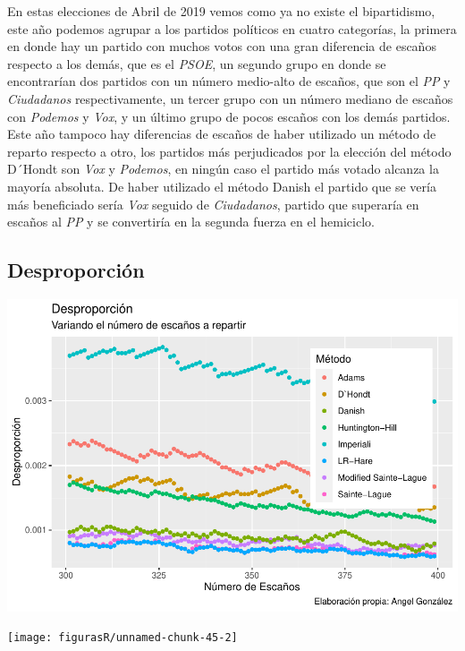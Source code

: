 \documentclass[12pt,a4paper,]{book}
\numberwithin{dummy}{section}
\theoremstyle{ocrenumbox}
\theoremstyle{blacknumex}
\theoremstyle{blacknumbox}
\theoremstyle{ocrenum}
\theoremstyle{ocrenum}
\begin{document}
En estas elecciones de Abril de 2019 vemos como ya no existe el
bipartidismo, este año podemos agrupar a los partidos políticos en
cuatro categorías, la primera en donde hay un partido con muchos votos
con una gran diferencia de escaños respecto a los demás, que es el
\emph{PSOE}, un segundo grupo en donde se encontrarían dos partidos con
un número medio-alto de escaños, que son el \emph{PP} y
\emph{Ciudadanos} respectivamente, un tercer grupo con un número mediano
de escaños con \emph{Podemos} y \emph{Vox}, y un último grupo de pocos
escaños con los demás partidos. Este año tampoco hay diferencias de
escaños de haber utilizado un método de reparto respecto a otro, los
partidos más perjudicados por la elección del método D´Hondt son
\emph{Vox} y \emph{Podemos}, en ningún caso el partido más votado
alcanza la mayoría absoluta. De haber utilizado el método Danish el
partido que se vería más beneficiado sería \emph{Vox} seguido de
\emph{Ciudadanos}, partido que superaría en escaños al \emph{PP} y se
convertiría en la segunda fuerza en el hemiciclo.

\hypertarget{desproporciuxf3n-13}{%
\subsection{Desproporción}\label{desproporciuxf3n-13}}

\begin{center}\includegraphics[width=1\linewidth]{figurasR/unnamed-chunk-45-1} \end{center}

\begin{center}\texttt{[image: figurasR/unnamed-chunk-45-2]} \end{center}
\end{document}
